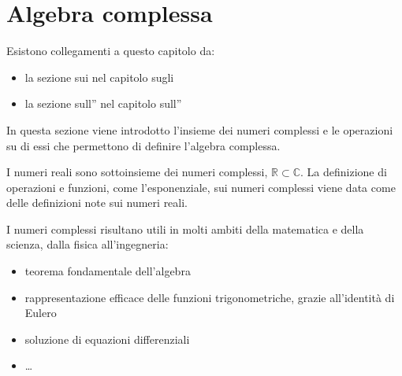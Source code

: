 \documentclass[letterpaper,10pt,italian]{jupyterBook}
\begin{document}
\sphinxstepscope




\chapter{Algebra complessa}
\label{\detokenize{ch/algebra/complex-algebra:algebra-complessa}}\label{\detokenize{ch/algebra/complex-algebra:math-hs-algebra-complex}}\label{\detokenize{ch/algebra/complex-algebra::doc}}
\sphinxAtStartPar
Esistono collegamenti a questo capitolo da:
\begin{itemize}
\item {} 
\sphinxAtStartPar
la sezione sui {\hyperref[\detokenize{ch/set/numeric-sets:sets-numeric-c}]{}} nel capitolo sugli {\hyperref[\detokenize{ch/set/numeric-sets:sets-numeric}]{}}

\item {} 
\sphinxAtStartPar
la sezione sull”{\hyperref[\detokenize{ch/algebra/complex-algebra-link:math-hs-algebra-complex-link}]{}} nel capitolo sull”{\hyperref[\detokenize{ch/algebra:math-hs-algebra}]{}}

\end{itemize}

\sphinxAtStartPar
In questa sezione viene introdotto l’insieme dei numeri complessi e le operazioni su di essi che permettono di definire l’algebra complessa.

\sphinxAtStartPar
I numeri reali sono sottoinsieme dei numeri complessi, \(\mathbb{R} \subset \mathbb{C}\). La definizione di operazioni e funzioni, come l’esponenziale, sui numeri complessi viene data come  delle definizioni note sui numeri reali.

\sphinxAtStartPar
I numeri complessi risultano utili in molti ambiti della matematica e della scienza, dalla fisica all’ingegneria:
\begin{itemize}
\item {} 
\sphinxAtStartPar
teorema fondamentale dell’algebra

\item {} 
\sphinxAtStartPar
rappresentazione efficace delle funzioni trigonometriche, grazie all’identità di Eulero

\item {} 
\sphinxAtStartPar
soluzione di equazioni differenziali

\item {} 
\sphinxAtStartPar
…

\end{itemize}
\end{document}
